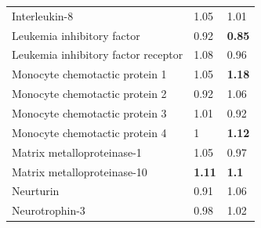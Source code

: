 \begin{table}[ht]
\begin{tabular}{lll}
\rowcolor[HTML]{EFEFEF} 
Interleukin-8                           & {\color[HTML]{C0C0C0} 1.05}          & {\color[HTML]{C0C0C0} 1.01}          \\
\rowcolor[HTML]{EFEFEF} 
Leukemia inhibitory factor              & {\color[HTML]{C0C0C0} 0.92}          & {\color[HTML]{CB0000} \textbf{0.85}} \\
\rowcolor[HTML]{EFEFEF} 
Leukemia inhibitory factor receptor     & {\color[HTML]{C0C0C0} 1.08}          & {\color[HTML]{C0C0C0} 0.96}          \\
Monocyte chemotactic protein 1          & {\color[HTML]{C0C0C0} 1.05}          & {\color[HTML]{009901} \textbf{1.18}} \\
Monocyte chemotactic protein 2          & {\color[HTML]{C0C0C0} 0.92}          & {\color[HTML]{C0C0C0} 1.06}          \\
Monocyte chemotactic protein 3          & {\color[HTML]{C0C0C0} 1.01}          & {\color[HTML]{C0C0C0} 0.92}          \\
Monocyte chemotactic protein 4          & {\color[HTML]{C0C0C0} 1}             & {\color[HTML]{009901} \textbf{1.12}} \\
\rowcolor[HTML]{EFEFEF} 
Matrix metalloproteinase-1              & {\color[HTML]{C0C0C0} 1.05}          & {\color[HTML]{C0C0C0} 0.97}          \\
\rowcolor[HTML]{EFEFEF} 
Matrix metalloproteinase-10             & {\color[HTML]{009901} \textbf{1.11}} & {\color[HTML]{009901} \textbf{1.1}}  \\
\rowcolor[HTML]{EFEFEF} 
Neurturin                               & {\color[HTML]{C0C0C0} 0.91}          & {\color[HTML]{C0C0C0} 1.06}          \\
\rowcolor[HTML]{EFEFEF} 
Neurotrophin-3                          & {\color[HTML]{C0C0C0} 0.98}          & {\color[HTML]{C0C0C0} 1.02}         
\end{tabular}
\label{table:Result1Friends3}
\end{table}



